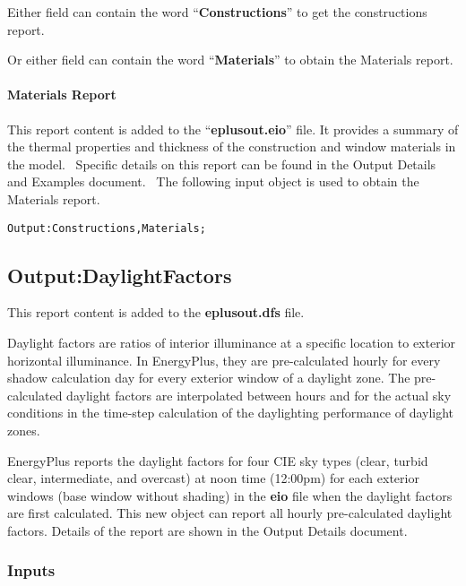 Either field can contain the word ``\textbf{Constructions}'' to get the constructions report.

Or either field can contain the word ``\textbf{Materials}'' to obtain the Materials report.

\paragraph{Materials Report}\label{materials-report}

This report content is added to the ``\textbf{eplusout.eio}'' file. It provides a summary of the thermal properties and thickness of the construction and window materials in the model.~ Specific details on this report can be found in the Output Details and Examples document.~ The following input object is used to obtain the Materials report.

\begin{lstlisting}
Output:Constructions,Materials;
\end{lstlisting}

\subsection{Output:DaylightFactors}\label{outputdaylightfactors}

This report content is added to the \textbf{eplusout.dfs} file.

Daylight factors are ratios of interior illuminance at a specific location to exterior horizontal illuminance. In EnergyPlus, they are pre-calculated hourly for every shadow calculation day for every exterior window of a daylight zone. The pre-calculated daylight factors are interpolated between hours and for the actual sky conditions in the time-step calculation of the daylighting performance of daylight zones.

EnergyPlus reports the daylight factors for four CIE sky types (clear, turbid clear, intermediate, and overcast) at noon time (12:00pm) for each exterior windows (base window without shading) in the \textbf{eio} file when the daylight factors are first calculated. This new object can report all hourly pre-calculated daylight factors. Details of the report are shown in the Output Details document.

\subsubsection{Inputs}\label{inputs-4-027}

